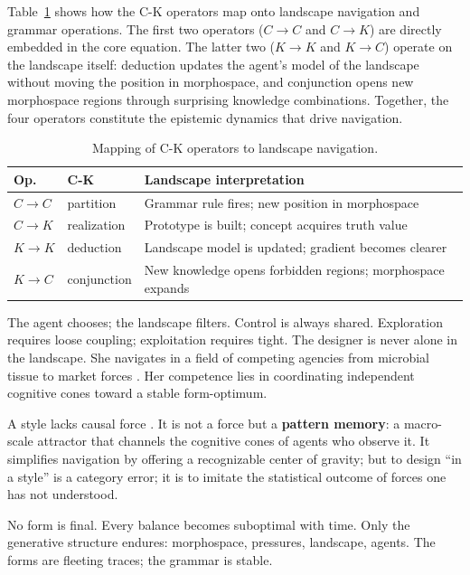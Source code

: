 Table~\ref{tab:ck-mapping} shows how the C-K operators map onto landscape navigation and grammar operations. The first two operators ($C \to C$ and $C \to K$) are directly embedded in the core equation. The latter two ($K \to K$ and $K \to C$) operate on the landscape itself: deduction updates the agent's model of the landscape without moving the position in morphospace, and conjunction opens new morphospace regions through surprising knowledge combinations. Together, the four operators constitute the epistemic dynamics that drive navigation.

\begin{table}[!t]
\centering
\caption{Mapping of C-K operators to landscape navigation.}
\label{tab:ck-mapping}
\small
\begin{tabularx}{\columnwidth}{@{}l l >{\raggedright\arraybackslash}X@{}}
\toprule
\textbf{Op.} & \textbf{C-K} & \textbf{Landscape interpretation} \\
\midrule
$C \!\to\! C$ & partition & Grammar rule fires; new position in morphospace \\[2pt]
$C \!\to\! K$ & realization & Prototype is built; concept acquires truth value \\[2pt]
$K \!\to\! K$ & deduction & Landscape model is updated; gradient becomes clearer \\[2pt]
$K \!\to\! C$ & conjunction & New knowledge opens forbidden regions; morphospace expands \\
\bottomrule
\end{tabularx}
\end{table}

The agent chooses; the landscape filters. Control is always shared. Exploration requires loose coupling; exploitation requires tight. The designer is never alone in the landscape. She navigates in a field of competing agencies from microbial tissue to market forces \parencite{Levin2022}. Her competence lies in coordinating independent cognitive cones toward a stable form-optimum.

A style lacks causal force \parencite{Kubler1962, Michl1995}. It is not a force but a \textbf{pattern memory}: a macro-scale attractor that channels the cognitive cones of agents who observe it. It simplifies navigation by offering a recognizable center of gravity; but to design ``in a style'' is a category error; it is to imitate the statistical outcome of forces one has not understood.

No form is final. Every balance becomes suboptimal with time. Only the generative structure endures: morphospace, pressures, landscape, agents. The forms are fleeting traces; the grammar is stable.

